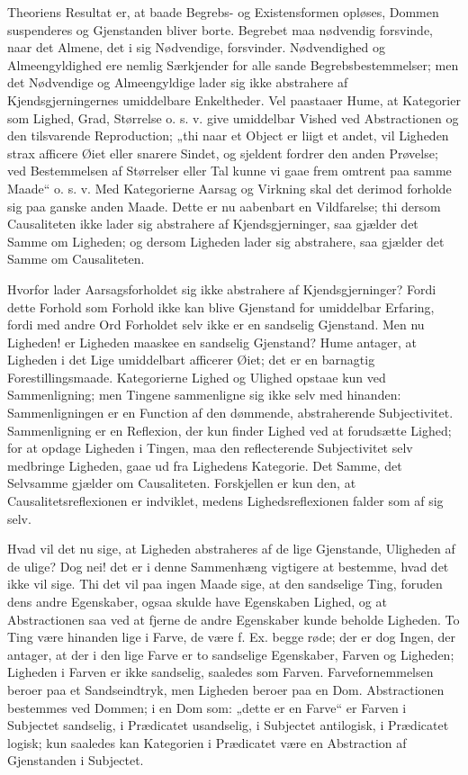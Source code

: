 \documentclass[12pt]{book}
\newcommand{\opage}[1]{\marginnote{\footnotesize\textit{[#1]}}}
\begin{document}
Theoriens Resultat er, at baade Begrebs- og Existensformen
opløses, Dommen suspenderes og Gjenstanden bliver
\opage{110}borte. Begrebet maa nødvendig forsvinde, naar det Almene,
det i sig Nødvendige, forsvinder. Nødvendighed og Almeengyldighed
ere nemlig Særkjender for alle sande Begrebsbestemmelser;
men det Nødvendige og Almeengyldige lader sig
ikke abstrahere af Kjendsgjerningernes umiddelbare Enkeltheder.
Vel paastaaer Hume, at Kategorier som Lighed, Grad,
Størrelse o. s. v. give umiddelbar Vished ved Abstractionen
og den tilsvarende Reproduction; „thi naar et Object er liigt
et andet, vil Ligheden strax afficere Øiet eller snarere Sindet,
og sjeldent fordrer den anden Prøvelse; ved Bestemmelsen af
Størrelser eller Tal kunne vi gaae frem omtrent paa samme
Maade“ o. s. v. Med Kategorierne Aarsag og Virkning skal
det derimod forholde sig paa ganske anden Maade. Dette
er nu aabenbart en Vildfarelse; thi dersom Causaliteten ikke
lader sig abstrahere af Kjendsgjerninger, saa gjælder det
Samme om Ligheden; og dersom Ligheden lader sig abstrahere,
saa gjælder det Samme om Causaliteten.

Hvorfor lader Aarsagsforholdet sig ikke abstrahere af
Kjendsgjerninger? Fordi dette Forhold som Forhold ikke kan
blive Gjenstand for umiddelbar Erfaring, fordi med andre
Ord Forholdet selv ikke er en sandselig Gjenstand. Men nu
Ligheden! er Ligheden maaskee en sandselig Gjenstand? Hume
antager, at Ligheden i det Lige umiddelbart afficerer Øiet;
det er en barnagtig Forestillingsmaade. Kategorierne Lighed
og Ulighed opstaae kun ved Sammenligning; men Tingene
sammenligne sig ikke selv med hinanden: Sammenligningen er
en Function af den dømmende, abstraherende Subjectivitet.
Sammenligning er en Reflexion, der kun finder Lighed ved
at forudsætte Lighed; for at opdage Ligheden i Tingen, maa
den reflecterende Subjectivitet selv medbringe Ligheden, gaae
ud fra Lighedens Kategorie. Det Samme, det Selvsamme
gjælder om Causaliteten. Forskjellen er kun den, at Causalitetsreflexionen
er indviklet, medens Lighedsreflexionen falder
som af sig selv.

\opage{111}Hvad vil det nu sige, at Ligheden abstraheres af de lige
Gjenstande, Uligheden af de ulige? Dog nei! det er i denne
Sammenhæng vigtigere at bestemme, hvad det ikke vil sige.
Thi det vil paa ingen Maade sige, at den sandselige Ting,
foruden dens andre Egenskaber, ogsaa skulde have Egenskaben
Lighed, og at Abstractionen saa ved at fjerne de andre Egenskaber
kunde beholde Ligheden. To Ting være hinanden lige
i Farve, de være f. Ex. begge røde; der er dog Ingen, der
antager, at der i den lige Farve er to sandselige Egenskaber,
Farven og Ligheden; Ligheden i Farven er ikke sandselig, saaledes
som Farven. Farvefornemmelsen beroer paa et Sandseindtryk,
men Ligheden beroer paa en Dom. Abstractionen
bestemmes ved Dommen; i en Dom som: „dette er en Farve“
er Farven i Subjectet sandselig, i Prædicatet usandselig, i
Subjectet antilogisk, i Prædicatet logisk; kun saaledes kan
Kategorien i Prædicatet være en Abstraction af Gjenstanden
i Subjectet.
\end{document}

